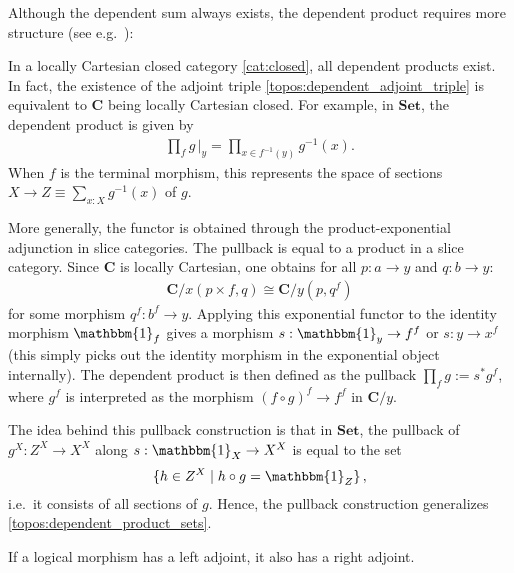     Although the dependent sum always exists, the dependent product requires more structure (see e.g.~\cite{huang2022locally}):
    \begin{property}
        In a locally Cartesian closed category \ref{cat:closed}, all dependent products exist. In fact, the existence of the adjoint triple \eqref{topos:dependent_adjoint_triple} is equivalent to $\mathbf{C}$ being locally Cartesian closed. For example, in $\mathbf{Set}$, the dependent product is given by
        \begin{gather}
            \label{topos:dependent_product_sets}
            \prod_fg\,\Big|_y=\prod_{x\in f^{-1}(y)}g^{-1}(x).
        \end{gather}
        When $f$ is the terminal morphism, this represents the space of sections $X\rightarrow Z\equiv\sum_{x:X}g^{-1}(x)$ of $g$.

        More generally, the functor is obtained through the product-exponential adjunction in slice categories. The pullback is equal to a product in a slice category. Since $\mathbf{C}$ is locally Cartesian, one obtains for all $p:a\rightarrow y$ and $q:b\rightarrow y$:
        \begin{gather}
            \mathbf{C}/x(p\times f,q)\cong\mathbf{C}/y(p,q^f)
        \end{gather}
        for some morphism $q^f:b^f\rightarrow y$. Applying this exponential functor to the identity morphism $\mathbbm{1}_f$ gives a morphism $s:\mathbbm{1}_y\rightarrow f^f$ or $s:y\rightarrow x^f$ (this simply picks out the identity morphism in the exponential object internally). The dependent product is then defined as the pullback $\prod_fg:=s^*g^f$, where $g^f$ is interpreted as the morphism $(f\circ g)^f\rightarrow f^f$ in $\mathbf{C}/y$.

        The idea behind this pullback construction is that in $\mathbf{Set}$, the pullback of $g^X:Z^X\rightarrow X^X$ along $s:\mathbbm{1}_X\rightarrow X^X$ is equal to the set \[\{h\in Z^X\mid h\circ g=\mathbbm{1}_Z\}\,,\] i.e.~it consists of all sections of $g$. Hence, the pullback construction generalizes \eqref{topos:dependent_product_sets}.
    \end{property}

    \begin{property}
        If a logical morphism has a left adjoint, it also has a right adjoint.
    \end{property}

